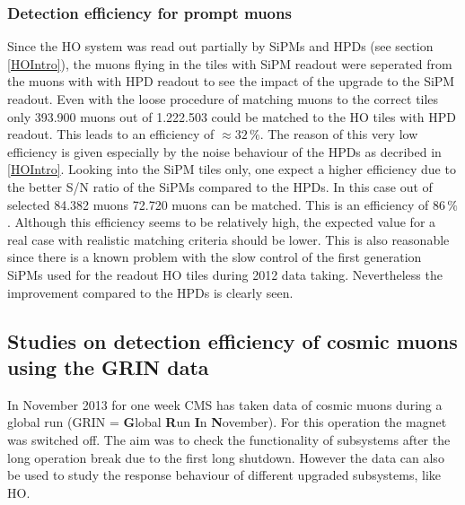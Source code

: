 		\subsubsection{Detection efficiency for prompt muons}
			Since the HO system was read out partially by SiPMs and HPDs (see section \ref{HOIntro}), the muons flying in the tiles with SiPM readout were seperated from the muons with with HPD readout to see
			the impact of the upgrade to the SiPM readout.
			Even with the loose procedure of matching muons to the correct tiles only 393.900 muons out of 1.222.503 could be matched to the HO tiles with HPD readout.
			This leads to an efficiency of $\approx32\,\%$.
			The reason of this very low efficiency is given especially by the noise behaviour of the HPDs as decribed in \ref{HOIntro}.
			Looking into the SiPM tiles only, one expect a higher efficiency due to the better S/N ratio of the SiPMs compared to the HPDs.
			In this case out of selected 84.382 muons 72.720 muons can be matched.
			This is an efficiency of $86\,\%$.
			Although this efficiency seems to be relatively high, the expected value for a real case with realistic matching criteria should be lower.
			This is also reasonable since there is a known problem with the slow control of the first generation SiPMs used for the readout HO tiles during 2012 data taking.
			Nevertheless the improvement compared to the HPDs is clearly seen.
	\subsection{Studies on detection efficiency of cosmic muons using the GRIN data} 
		In November 2013 for one week CMS has taken data of cosmic muons during a global run (GRIN = \textbf{G}lobal \textbf{R}un \textbf{I}n \textbf{N}ovember).
		For this operation the magnet was switched off.
		The aim was to check the functionality of subsystems after the long operation break due to the first long shutdown.
		However the data can also be used to study the response behaviour of different upgraded subsystems, like HO.
